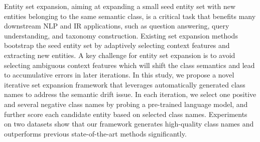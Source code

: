 Entity set expansion, aiming at expanding a small seed entity set with new entities belonging to the same semantic class, is a critical task that benefits many downstream NLP and IR applications, such as question answering, query understanding, and taxonomy construction. Existing set expansion methods bootstrap the seed entity set by adaptively selecting context features and extracting new entities. A key challenge for entity set expansion is to avoid selecting ambiguous context features which will shift the class semantics and lead to accumulative errors in later iterations. In this study, we propose a novel iterative set expansion framework that leverages automatically generated class names to address the semantic drift issue. In each iteration, we select one positive and several negative class names by probing a pre-trained language model, and further score each candidate entity based on selected class names. Experiments on two datasets show that our framework generates high-quality class names and outperforms previous state-of-the-art methods significantly.
